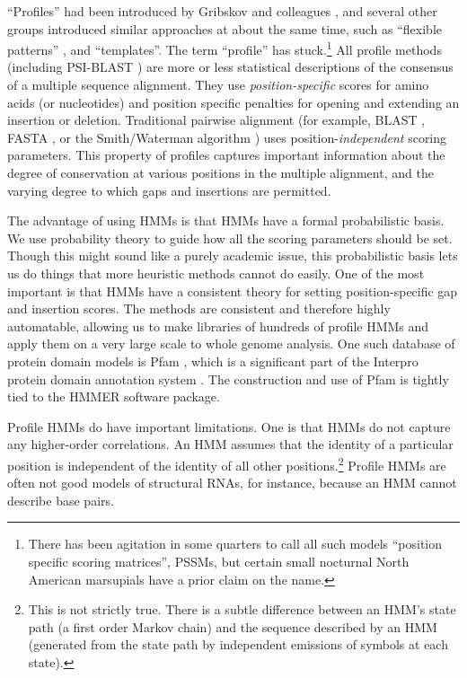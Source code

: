 ``Profiles'' had been introduced by Gribskov and colleagues
\citep{Gribskov87,Gribskov90}, and several other groups introduced
similar approaches at about the same time, such as ``flexible
patterns'' \citep{Barton90}, and
``templates''\citep{Bashford87,Taylor86}. The term ``profile'' has
stuck.\footnote{There has been agitation in some quarters to call all
  such models ``position specific scoring matrices'', PSSMs, but
  certain small nocturnal North American marsupials have a prior claim
  on the name.}  All profile methods (including PSI-BLAST
\citep{Altschul97}) are more or less statistical descriptions of the
consensus of a multiple sequence alignment. They use
\emph{position-specific} scores for amino acids (or nucleotides) and
position specific penalties for opening and extending an insertion or
deletion.  Traditional pairwise alignment (for example, BLAST
\citep{Altschul90}, FASTA \citep{Pearson88}, or the Smith/Waterman
algorithm \citep{Smith81}) uses position-{\em independent} scoring
parameters. This property of profiles captures important information
about the degree of conservation at various positions in the multiple
alignment, and the varying degree to which gaps and insertions are
permitted.

The advantage of using HMMs is that HMMs have a formal probabilistic
basis. We use probability theory to guide how all the scoring
parameters should be set. Though this might sound like a purely
academic issue, this probabilistic basis lets us do things that more
heuristic methods cannot do easily. One of the most important is that
HMMs have a consistent theory for setting position-specific gap and
insertion scores. The methods are consistent and therefore highly
automatable, allowing us to make libraries of hundreds of profile HMMs
and apply them on a very large scale to whole genome analysis.  One
such database of protein domain models is Pfam
\citep{Sonnhammer97,Finn10}, which is a significant part of the
Interpro protein domain annotation system \citep{Mulder03}. The
construction and use of Pfam is tightly tied to the HMMER software
package.

Profile HMMs do have important limitations. One is that HMMs do not
capture any higher-order correlations.  An HMM assumes that the
identity of a particular position is independent of the identity of
all other positions.\footnote{This is not strictly true. There is a
  subtle difference between an HMM's state path (a first order Markov
  chain) and the sequence described by an HMM (generated from the
  state path by independent emissions of symbols at each state).}
Profile HMMs are often not good models of structural RNAs, for
instance, because an HMM cannot describe base pairs.



